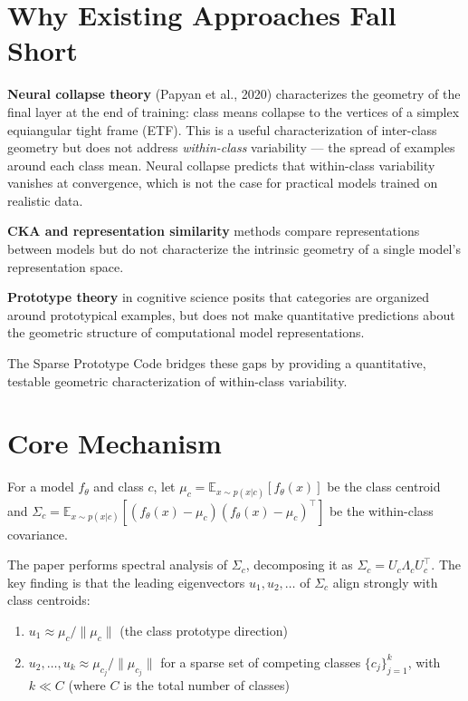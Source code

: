 \documentclass[10pt,twocolumn]{article}
\begin{document}
\section{Why Existing Approaches Fall Short}

\textbf{Neural collapse theory} (Papyan et al., 2020) characterizes the
geometry of the final layer at the end of training: class means collapse
to the vertices of a simplex equiangular tight frame (ETF). This is a
useful characterization of inter-class geometry but does not address
\emph{within-class} variability — the spread of examples around each class
mean. Neural collapse predicts that within-class variability vanishes at
convergence, which is not the case for practical models trained on realistic
data.

\textbf{CKA and representation similarity} methods compare representations
between models but do not characterize the intrinsic geometry of a single
model's representation space.

\textbf{Prototype theory} in cognitive science posits that categories are
organized around prototypical examples, but does not make quantitative
predictions about the geometric structure of computational model representations.

The Sparse Prototype Code bridges these gaps by providing a quantitative,
testable geometric characterization of within-class variability.

\section{Core Mechanism}

For a model $f_\theta$ and class $c$, let $\mu_c = \mathbb{E}_{x \sim p(x|c)}[f_\theta(x)]$
be the class centroid and $\Sigma_c = \mathbb{E}_{x \sim p(x|c)}[(f_\theta(x) - \mu_c)(f_\theta(x) - \mu_c)^\top]$
be the within-class covariance.

The paper performs spectral analysis of $\Sigma_c$, decomposing it as
$\Sigma_c = U_c \Lambda_c U_c^\top$. The key finding is that the leading
eigenvectors $u_1, u_2, \ldots$ of $\Sigma_c$ align strongly with class
centroids:
\begin{enumerate}[itemsep=2pt,parsep=0pt]
  \item $u_1 \approx \mu_c / \|\mu_c\|$ (the class prototype direction)
  \item $u_2, \ldots, u_k \approx \mu_{c_j} / \|\mu_{c_j}\|$ for a sparse
    set of competing classes $\{c_j\}_{j=1}^{k}$, with $k \ll C$ (where
    $C$ is the total number of classes)
\end{enumerate}
\end{document}
